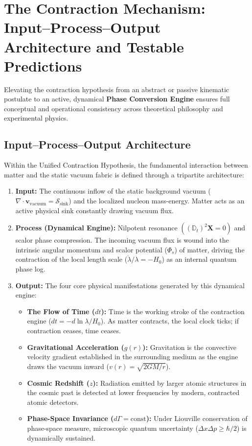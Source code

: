 \section{The Contraction Mechanism: Input--Process--Output Architecture and Testable Predictions}
\label{sec:mekanizma_ve_deneyler}

Elevating the contraction hypothesis from an abstract or passive kinematic postulate to an active, dynamical \textbf{Phase Conversion Engine} ensures full conceptual and operational consistency across theoretical philosophy and experimental physics.

\subsection{Input--Process--Output Architecture}
\label{sec:input_output_mimari}

Within the Unified Contraction Hypothesis, the fundamental interaction between matter and the static vacuum fabric is defined through a tripartite architecture:
\begin{enumerate}
    \item \textbf{Input:} The continuous inflow of the static background vacuum ($\nabla \cdot \mathbf{v}_{\mathrm{vacuum}} = \mathcal{S}_{\mathrm{sink}}$) and the localized nucleon mass-energy. Matter acts as an active physical sink constantly drawing vacuum flux.
    \item \textbf{Process (Dynamical Engine):} Nilpotent resonance $((\mathbb{D}_t)^2 \mathbf{X} = 0)$ and scalor phase compression. The incoming vacuum flux is wound into the intrinsic angular momentum and scalor potential ($\Phi_s$) of matter, driving the contraction of the local length scale ($\dot{\lambda}/\lambda = -H_0$) as an internal quantum phase log.
    \item \textbf{Output:} The four core physical manifestations generated by this dynamical engine:
          \begin{itemize}
              \item \textbf{The Flow of Time ($dt$):} Time is the working stroke of the contraction engine ($dt = -d\ln\lambda / H_0$). As matter contracts, the local clock ticks; if contraction ceases, time ceases.
              \item \textbf{Gravitational Acceleration ($g(r)$):} Gravitation is the convective velocity gradient established in the surrounding medium as the engine draws the vacuum inward ($v(r) = \sqrt{2GM/r}$).
              \item \textbf{Cosmic Redshift ($z$):} Radiation emitted by larger atomic structures in the cosmic past is detected at lower frequencies by modern, contracted atomic detectors.
              \item \textbf{Phase-Space Invariance ($d\Gamma = \text{const}$):} Under Liouville conservation of phase-space measure, microscopic quantum uncertainty ($\Delta x \Delta p \ge \hbar/2$) is dynamically sustained.
          \end{itemize}
\end{enumerate}

